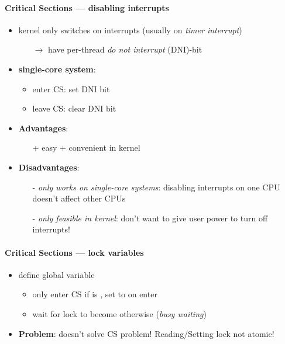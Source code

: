 \paragraph{Critical Sections --- disabling interrupts}
\begin{itemize}
  \item kernel only switches on interrupts (usually on \emph{timer interrupt})
  \begin{itemize}
    \item[$ \to $] have per-thread \emph{do not interrupt} (DNI)-bit
  \end{itemize}
  \item \textbf{single-core system}:
  \begin{itemize}
    \item enter CS: set DNI bit
    \item leave CS: clear DNI bit
  \end{itemize}
  \item \textbf{Advantages}:
  \begin{itemize}
    \item[+] easy + convenient in kernel
  \end{itemize}
  \item \textbf{Disadvantages}:
  \begin{itemize}
    \item[-] \emph{only works on single-core systems}: disabling interrupts on one CPU doesn't affect other CPUs
    \item[-] \emph{only feasible in kernel}: don't want to give user power to turn off interrupts!
  \end{itemize}
\end{itemize}

\paragraph{Critical Sections --- lock variables}
\begin{itemize}
  \item define global  variable
  \begin{itemize}
    \item only enter CS if  is , set to  on enter
    \item wait for lock to become  otherwise (\emph{busy waiting})
  \end{itemize}
  \item \textbf{Problem}: doesn't solve CS problem! Reading/Setting lock not atomic!
\end{itemize}

